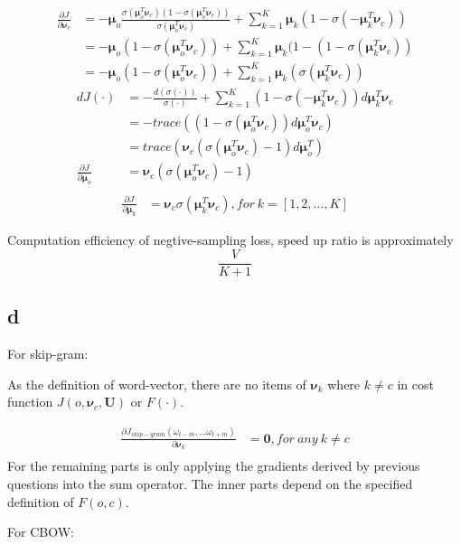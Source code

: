 \documentclass[11pt, oneside]{article}   	%
\begin{document}
\begin{align}
\frac{\partial J}{\partial \bm{\nu}_c} &= -\bm\mu_o\frac{\sigma(\bm{\mu}_o^T\bm\nu_c)(1-\sigma(\bm{\mu}_o^T\bm\nu_c))}{\sigma(\bm{\mu}_o^T\bm\nu_c)} + \sum_{k = 1}^K \bm\mu_k(1 - \sigma(-\bm\mu_k^T\bm\nu_c))\\
&= -\bm\mu_o(1-\sigma(\bm{\mu}_o^T\bm\nu_c)) + \sum_{k = 1}^K \bm\mu_k(1 - (1-\sigma(\bm\mu_k^T\bm\nu_c))\\
&= -\bm\mu_o(1-\sigma(\bm{\mu}_o^T\bm\nu_c)) +\sum_{k = 1}^K \bm\mu_k(\sigma(\bm\mu_k^T\bm\nu_c))
\end{align}
\begin{align}
d J(\cdot) &= - \frac{d(\sigma(\cdot))}{\sigma(\cdot)} +\sum_{k = 1}^{K}(1 - \sigma(-\bm\mu_k^T\bm\nu_c))d\bm\mu_k^T\bm\nu_c\\
&=- trace({(1-\sigma(\bm\mu_o^T \bm\nu_c)) d \bm\mu_o^T \bm\nu_c}) \\
&= trace(\bm\nu_c(\sigma(\bm\mu_o^T \bm\nu_c)-1)d \bm\mu_o^T)\\
\frac{\partial J}{\partial \bm{\mu}_o} &= \bm\nu_c(\sigma(\bm\mu_o^T \bm\nu_c)-1)\\
\end{align}
\begin{align}
\frac{\partial J}{\partial \bm{\mu}_k} &= \bm\nu_c\sigma(\bm\mu_k^T\bm\nu_c), for~k = [1, 2, ..., K]
\end{align}

Computation efficiency of negtive-sampling loss, speed up ratio is approximately
$$\frac{V}{K+1}$$

\subsection{d}
For skip-gram: 

As the definition of word-vector, there are no items of $\bm\nu_k$ where $k \neq c$ in cost function $J(o, \bm\nu_c, \bm{U})$ or $F(\cdot)$.

\begin{align}
\frac{\partial J_{skip-gram}(\omega_{t-m},...\omega_{t+m})}{\partial \bm\nu_k} &= \bm{0}, for~any~k\neq c\\
\end{align}
For the remaining parts is only applying the gradients derived by previous questions into the sum operator. The inner parts depend on the specified definition of $F(o, c)$.

For CBOW:
\end{document}
